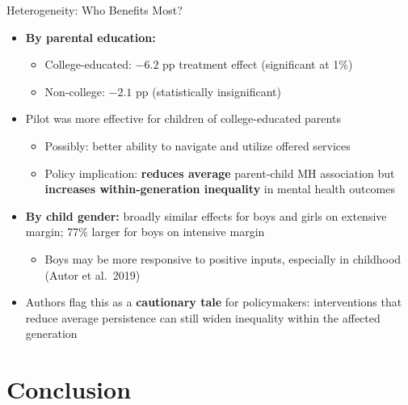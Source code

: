 \documentclass[aspectratio=169]{beamer}
\begin{document}
\begin{frame}{Heterogeneity: Who Benefits Most?}
  \begin{itemize}
    \item \textbf{By parental education:}
    \begin{itemize}
      \item College-educated: $-6.2$ pp treatment effect (significant at 1\%)
      \item Non-college: $-2.1$ pp (statistically insignificant)
    \end{itemize}
    \item Pilot was more effective for children of college-educated parents
    \begin{itemize}
      \item Possibly: better ability to navigate and utilize offered services
      \item Policy implication: \textbf{reduces average} parent-child MH association but \textbf{increases within-generation inequality} in mental health outcomes
    \end{itemize}
    \item \textbf{By child gender:} broadly similar effects for boys and girls on extensive margin; 77\% larger for boys on intensive margin
    \begin{itemize}
      \item Boys may be more responsive to positive inputs, especially in childhood (Autor et al.\ 2019)
    \end{itemize}
    \item Authors flag this as a \textbf{cautionary tale} for policymakers: interventions that reduce average persistence can still widen inequality within the affected generation
  \end{itemize}
\end{frame}

\section{Conclusion}
\end{document}
